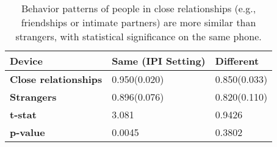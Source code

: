 \begin{table}[t]
\small
\centering\caption{Behavior patterns of people in close relationships (e.g., friendships or intimate partners) are more similar than strangers, with statistical significance on the same phone.}
\label{tab:similarity}
\begin{tabular}{lll}
\toprule
\textbf{Device}                         & \textbf{Same (IPI Setting)} & \textbf{Different} \\
\midrule
\textbf{Close relationships} & 0.950(0.020)         & 0.850(0.033)         \\
\textbf{Strangers}                & 0.896(0.076)         & 0.820(0.110)         \\
\midrule
\textbf{t-stat}                   & 3.081                & 0.9426               \\
\textbf{p-value}                  & 0.0045               & 0.3802               \\
\bottomrule
\end{tabular}
\end{table}




